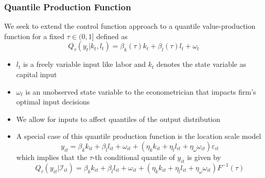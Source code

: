\documentclass{beamer}
\begin{document}

\begin{frame}
\frametitle{Quantile Production Function}
We seek to extend the control function approach to a quantile value-production function for a fixed $\tau\in(0,1]$ defined as
\begin{equation}
	Q_{\tau}(y_{t}|k_{t}, l_{t})=\beta_{k}(\tau)k_{t}+\beta_{l}(\tau)l_{t}+\omega_{t}
\end{equation}
\pause
\begin{itemize}
	\item $l_{t}$ is a freely variable input like labor and $k_{t}$ denotes the state variable as capital input
	\item $\omega_{t}$ is an unobserved state variable to the econometrician that impacts firm's optimal input decisions
	\item We allow for inputs to affect quantiles of the output distribution
	\item A special case of this quantile production function is the location scale model
	\pause
	\begin{equation}
	 y_{it}=\beta_{k}k_{it}+\beta_{l}l_{it}+\omega_{it}+(\eta_{k}k_{it}+\eta_{l}l_{it}+\eta_{\omega}\omega_{it})\varepsilon_{it}
	\end{equation}
	\pause
	which implies that the $\tau$-th conditional quantile of $y_{it}$ is given by
	\begin{equation}
	Q_{\tau}(y_{it}|\mathcal{I}_{it})=\beta_{k}k_{it}+\beta_{l}l_{it}+\omega_{it}+(\eta_{k}k_{it}+\eta_{l}l_{it}+\eta_{\omega}\omega_{it})F^{-1}(\tau)
	\end{equation}
\end{itemize}
\end{frame}
\end{document}
